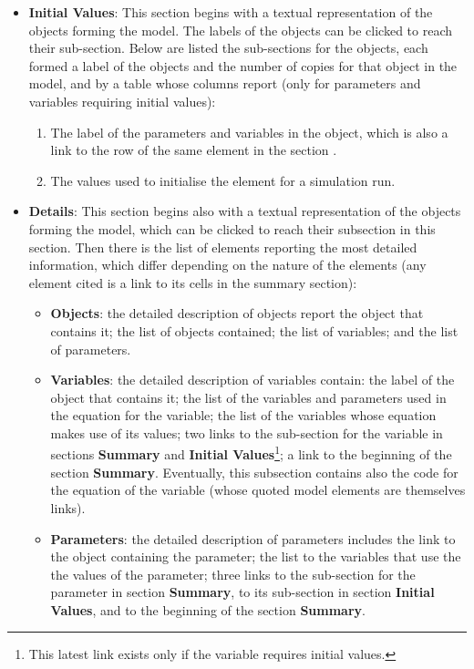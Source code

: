 \documentclass [11pt,a4paper] {book}
\begin{document}
\begin{itemize}
  \item \textbf{Initial Values}: This section begins with a textual representation of the
  objects forming the model. The labels of the objects can be clicked to reach their
  sub-section. Below are listed the sub-sections for the objects, each formed a label of the objects and the number of copies for that object in the
  model, and by a table
  whose columns report (only for parameters and variables requiring initial values):
  \begin{enumerate}
     \item The label of the parameters and variables in the object, which is also a link
    to the row of the same element in the section .
    \item The values used to initialise the element for a simulation run.
  \end{enumerate}
  \item \textbf{Details}: This section begins also with a textual representation of the
  objects forming the model, which can be clicked to reach their subsection in this section.
  Then there is the list of elements reporting the most detailed information, which
  differ depending on the nature of the elements (any element cited is a link to its cells in the summary section):
\begin{itemize}
  \item \textbf{Objects}: the detailed description of objects report the object that
  contains it; the list of objects contained; the list of variables; and the list of
  parameters.
  \item \textbf{Variables}: the detailed description of variables contain: the label of
  the object that contains it; the list of the variables and parameters used in the
  equation for the variable; the list of the variables whose equation makes use of its
  values; two links to the sub-section for the variable in sections \textbf{Summary} and \textbf{Initial Values}\footnote{This latest link exists only if the variable requires initial values.};
  a link to the beginning of the section \textbf{Summary}. Eventually, this subsection
  contains also the code for the equation of the variable (whose quoted model elements are themselves
  links).
  \item \textbf{Parameters}: the detailed description of parameters includes the link to
  the object containing the parameter; the list to the variables that use the the values
  of the parameter; three links to the sub-section for the parameter in section
  \textbf{Summary}, to its sub-section in section \textbf{Initial Values}, and to the beginning of the
  section \textbf{Summary}.
\end{itemize}


\end{itemize}
\end{document}
